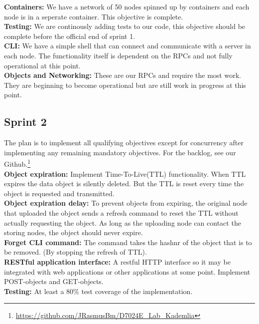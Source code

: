 \textbf{Containers:} We have a network of 50 nodes spinned up by containers and each node is in a seperate container. This objective is complete.\\

\textbf{Testing:} We are continously adding tests to our code, this objective should be complete before the official end of sprint 1.\\

\textbf{CLI:} We have a simple shell that can connect and communicate with a server in each node. The functionality itself is dependent on the RPCs and not fully operational at this point.\\

\textbf{Objects and Networking:} These are our RPCs and require the most work. They are beginning to become operational but are still work in progress at this point.

\subsection{Sprint 2}\label{sec:sprint-2}
The plan is to implement all qualifying objectives except for concurrency after implementing any remaining mandatory objectives. For the backlog, see our Github.\footnote{\href{https://github.com/JRasmusBm/D7024E_Lab_Kademlia}{https://github.com/JRasmusBm/D7024E\_Lab\_Kademlia}}\\

\textbf{Object expiration:} Implement Time-To-Live(TTL) functionality. When TTL expires the data object is silently deleted. But the TTL is reset every time the object is requested and transmitted.\\

\textbf{Object expiration delay:} To prevent objects from expiring, the original node that uploaded the object sends a refresh command to reset the TTL without actually requesting the object. As long as the uploading node can contact the storing nodes, the object should never expire.\\

\textbf{Forget CLI command:} The command takes the hashnr of the object that is to be removed. (By stopping the refresh of TTL).\\

\textbf{RESTful application interface:} A restful HTTP interface so it may be integrated with web applications or other applications at some point. Implement POST-objects and GET-objects.\\

\textbf{Testing:} At least a 80\% test coverage of the implementation.

